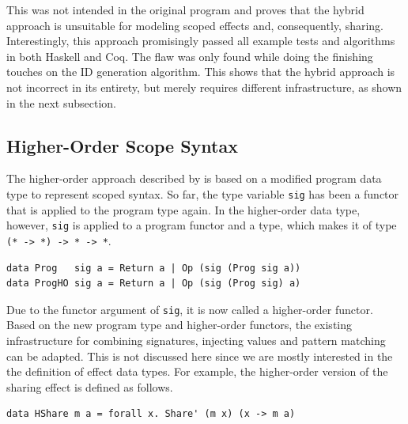 \documentclass[a4paper, 11pt, fleqn, twoside]{scrreprt}
\newcommand{\hinl}[1]{\texttt{#1}}
\begin{document}
This was not intended in the original program and proves that the hybrid approach is unsuitable for modeling scoped effects and, consequently, sharing.
Interestingly, this approach promisingly passed all example tests and algorithms in both Haskell and Coq.
The flaw was only found while doing the finishing touches on the ID generation algorithm.
This shows that the hybrid approach is not incorrect in its entirety, but merely requires different infrastructure, as shown in the next subsection.

\subsection{Higher-Order Scope Syntax}
\label{subsec:HOscopesyntax}
The higher-order approach described by \citet{wu2014effect} is based on a modified  program data type to represent scoped syntax.
So far, the type variable \hinl{sig} has been a functor that is applied to the program type again.
In the higher-order data type, however, \hinl{sig} is applied to a program functor and a type, which makes it of type \hinl{(* -> *) -> * -> *}.

\begin{verbatim}
data Prog   sig a = Return a | Op (sig (Prog sig a))
data ProgHO sig a = Return a | Op (sig (Prog sig) a)
\end{verbatim}

Due to the functor argument of \hinl{sig}, it is now called a higher-order functor.
Based on the new program type and higher-order functors, the existing infrastructure for combining signatures, injecting values and pattern matching can be adapted.
This is not discussed here since we are mostly interested in the the definition of effect data types.
For example, the higher-order version of the sharing effect is defined as follows.

\begin{verbatim}
data HShare m a = forall x. Share' (m x) (x -> m a)
\end{verbatim}
\end{document}
